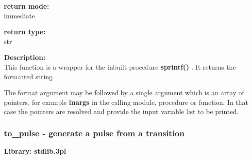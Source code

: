             {\bf return mode:} \\
            immediate

            {\bf return type:} \\
            str

            {\bf Description:} \\
            This function is a wrapper for the inbuilt procedure
            {\bf sprintf()} . It returns the formatted string.
        
            The format argument may be followed by a single argument which is an array of
            pointers, for example {\bf inargs} in the calling module, procedure or function.
            In that case the pointers are resolved and provide the input variable list to be
            printed.







%
%
%
%
%


        \subsubsection{to\_pulse - generate a pulse from a transition}\label{sec:lftopulse}

            {\bf Library: stdlib.3pl}


